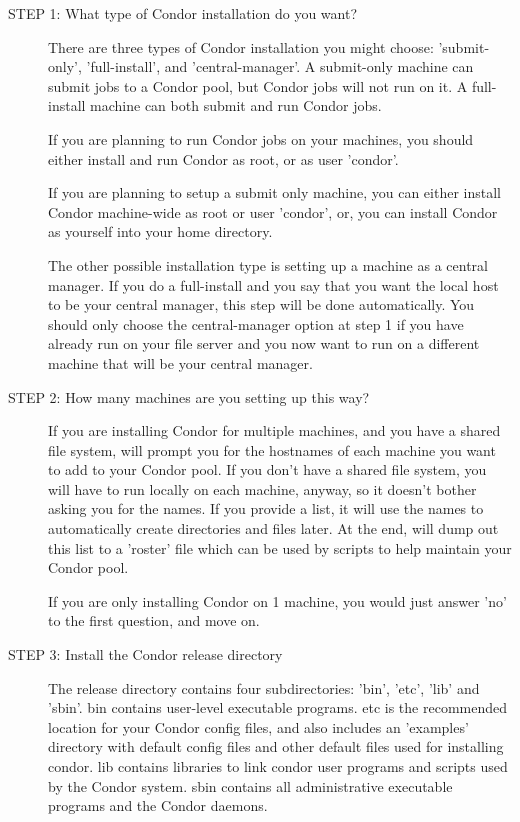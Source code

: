 \begin{description}
\item[STEP 1: What type of Condor installation do you want?]

     There are three types of Condor installation you might choose:
     'submit-only', 'full-install', and 'central-manager'.  A
     submit-only machine can submit jobs to a Condor pool, but Condor
     jobs will not run on it.  A full-install machine can both submit
     and run Condor jobs.  

     If you are planning to run Condor jobs on your machines, you
     should either install and run Condor as root, or as user
     'condor'.  

     If you are planning to setup a submit only machine, you can
     either install Condor machine-wide as root or user 'condor', or,
     you can install Condor as yourself into your home directory.

     The other possible installation type is setting up a machine as a
     central manager.  If you do a full-install and you say that you
     want the local host to be your central manager, this step will be
     done automatically.  You should only choose the central-manager
     option at step 1 if you have already run  on your
     file server and you now want to run  on a different
     machine that will be your central manager.

\item[STEP 2: How many machines are you setting up this way?]

     If you are installing Condor for multiple machines, and you have
     a shared file system,  will prompt you for the
     hostnames of each machine you want to add to your Condor pool.
     If you don't have a shared file system, you will have to run
      locally on each machine, anyway, so it doesn't
     bother asking you for the names.  If you provide a list, it will
     use the names to automatically create directories and files
     later.  At the end,  will dump out this list to a
     'roster' file which can be used by scripts to help maintain your
     Condor pool.

     If you are only installing Condor on 1 machine, you would just
     answer 'no' to the first question, and move on.

\item[STEP 3: Install the Condor release directory] 
     The release directory contains four subdirectories: 'bin', 'etc',
     'lib' and 'sbin'.  bin contains user-level executable programs.
     etc is the recommended location for your Condor config files, and
     also includes an 'examples' directory with default config files
     and other default files used for installing condor.  lib contains
     libraries to link condor user programs and scripts used by the
     Condor system.  sbin contains all administrative executable
     programs and the Condor daemons.  


\end{description}
